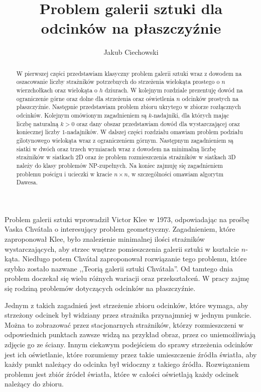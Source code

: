 \documentclass[brudnopis]{xmgr}
\author   {Jakub Ciechowski}
\title    {Problem galerii sztuki dla odcinków na płaszczyźnie}
\date     {\ymdtoday}
\theoremstyle{definition}
\begin{document}
\begin{abstract}
 W pierwszej części przedstawiam klasyczny problem galerii sztuki wraz z dowodem na oszacowanie liczby strażników potrzebnych do strzeżenia wielokąta prostego o $n$ wierzchołkach oraz wielokąta o $h$ dziurach. W kolejnym rozdziale prezentuję dowód na ograniczenie górne oraz dolne dla strzeżenia oraz oświetlenia $n$ odcinków prostych na płaszczyźnie. Następnie przedstawiam problem zbioru ukrytego w zbiorze rozłącznych odcinków. Kolejnym omówionym zagadnieniem są $k$-nadajniki, dla których mając liczbę naturalną $k > 0$ oraz dany obszar przedstawiam dowód dla wystarczającej oraz koniecznej liczby $1$-nadajników. W dalszej części rozdziału omawiam problem podziału gilotynowego wielokąta wraz z ograniczeniem górnym. Następnym zagadnieniem są siatki w dwóch oraz trzech wymiarach wraz z dowodem na minimalną liczbę strażników w siatkach 2D oraz że problem rozmieszczenia strażników w siatkach 3D należy do klasy problemów NP-zupełnych. Na koniec zajmuję się zagadnieniem problemu pościgu i ucieczki w kracie $n \times n$, w szczególności omawiam algorytm Dawesa.
\end{abstract}

\maketitle

\introduction
Problem galerii sztuki wprowadził Victor Klee w 1973, odpowiadając na prośbę Vaska Chv\'atala o interesujący problem geometryczny. Zagadnieniem, które zaproponował Klee, było znalezienie minimalnej ilości strażników wystarczających, aby strzec wnętrze pomieszczenia galerii sztuki w kształcie $n$-kąta. Niedługo potem Chv\'atal zaproponował rozwiązanie tego problemu, które szybko zostało nazwane ,,Teorią galerii sztuki Chv\'atala''. Od tamtego dnia problem doczekał się wielu różnych wariacji oraz przekształceń. W pracy zajmę się rodziną problemów dotyczących odcinków na płaszczyźnie. 

Jednym z takich zagadnień jest strzeżenie zbioru odcinków, które wymaga, aby strzeżony odcinek był widziany przez strażnika przynajmniej w jednym punkcie. Można to zobrazować przez stacjonarnych strażników, którzy rozmieszczeni w odpowiednich punktach zawsze widzą na przykład obraz, przez co uniemożliwiają zdjęcie go ze ściany. Innym ciekawym podejściem do sprawy strzeżenia odcinków jest ich oświetlanie, które  rozumiemy przez takie umieszczenie źródła światła, aby każdy punkt należący do odcinka był widoczny z takiego źródła. Rozwiązaniem problemu jest zbiór źródeł światła, które w całości oświetlają każdy odcinek należący do zbioru. 
\end{document}

